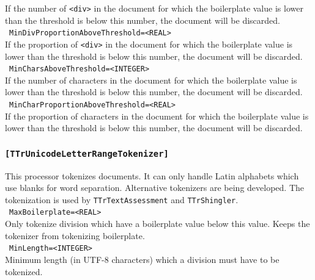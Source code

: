 \documentclass[12pt,a4paper]{article}
\begin{document}
If the number of \texttt{<div>} in the document for which the boilerplate value is lower than the threshold is below this number, the document will be discarded.\\

\noindent\textbullet~\texttt{MinDivProportionAboveThreshold=<REAL>}\\

If the proportion of \texttt{<div>} in the document for which the boilerplate value is lower than the threshold is below this number, the document will be discarded.\\

\noindent\textbullet~\texttt{MinCharsAboveThreshold=<INTEGER>}\\

If the number of characters in the document for which the boilerplate value is lower than the threshold is below this number, the document will be discarded.\\

\noindent\textbullet~\texttt{MinCharProportionAboveThreshold=<REAL>}\\

If the proportion of characters in the document for which the boilerplate value is lower than the threshold is below this number, the document will be discarded.\\


\subsubsection{\texttt{[TTrUnicodeLetterRangeTokenizer]}}
\label{sec:unicodeletterrangetokenizer}

This processor tokenizes documents.
It can only handle Latin alphabets which use blanks for word separation.
Alternative tokenizers are being developed.
The tokenization is used by \texttt{TTrTextAssessment} and \texttt{TTrShingler}.\\

\noindent\textbullet~\texttt{MaxBoilerplate=<REAL>}\\

Only tokenize division which have a boilerplate value below this value.
Keeps the tokenizer from tokenizing boilerplate.\\

\noindent\textbullet~\texttt{MinLength=<INTEGER>}\\

Minimum length (in UTF-8 characters) which a division must have to be tokenized.\\
\end{document}
